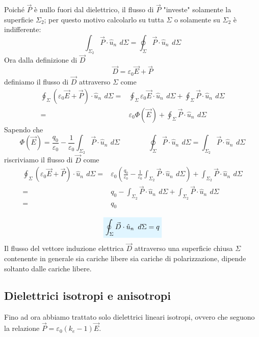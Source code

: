 \documentclass[x11names]{report}
\newcommand{\viola}[1]{%
	\colorbox{myblue}{$\displaystyle #1$}
}
\begin{document}
Poiché \(\vec{P}\) è nullo fuori dal dielettrico, il flusso di \(\vec{P}\) "investe" solamente la superficie \(\Sigma_2\); per questo motivo calcolarlo su tutta \(\Sigma\) o solamente su \(\Sigma_2\) è indifferente:
\[
\int_{\Sigma_2}\vec{P}\cdot\hat{u}_n \,\ d\Sigma = \oint_{\Sigma}\vec{P}\cdot\hat{u}_n \,\ d\Sigma
\]
Ora dalla definizione di \(\vec{D}\)
\[
\vec{D} = \varepsilon_0 \vec{E} + \vec{P}
\]
definiamo il flusso di \(\vec{D}\) attraverso \(\Sigma\) come
\begin{align*}
	\oint_\Sigma \left(\varepsilon_0 \vec{E} + \vec{P}\right)\cdot\hat{u}_n \,\ d\Sigma =& \oint_\Sigma \varepsilon_0 \vec{E}\cdot\hat{u}_n \,\ d\Sigma +  \oint_\Sigma\vec{P}\cdot\hat{u}_n \,\ d\Sigma  \\
	=& \varepsilon_0 \Phi(\vec{E}) +  \oint_\Sigma\vec{P}\cdot\hat{u}_n \,\ d\Sigma
\end{align*}
Sapendo che
\[
\Phi(\vec{E}) = \frac{q_0}{\varepsilon_0} - \frac{1}{\varepsilon_0} \int_{\Sigma_2} \vec{P}\cdot\hat{u}_n \,\ d\Sigma \qquad \qquad   \oint_{\Sigma}\vec{P}\cdot\hat{u}_n \,\ d\Sigma = \int_{\Sigma_2}\vec{P}\cdot\hat{u}_n \,\ d\Sigma 
\]
riscriviamo il flusso di \(\vec{D}\) come 
\begin{align*}
	\oint_\Sigma \left(\varepsilon_0 \vec{E} + \vec{P}\right)\cdot\hat{u}_n \,\ d\Sigma =& \varepsilon_0\left(\frac{q_0}{\varepsilon_0} - \frac{1}{\varepsilon_0} \int_{\Sigma_2} \vec{P}\cdot\hat{u}_n \,\ d\Sigma\right) + \int_{\Sigma_2}\vec{P}\cdot\hat{u}_n \,\ d\Sigma \\
	=& q_0 - \int_{\Sigma_2} \vec{P}\cdot\hat{u}_n \,\ d\Sigma+ \int_{\Sigma_2}\vec{P}\cdot\hat{u}_n \,\ d\Sigma \\
	=& q_0
\end{align*}

\begin{equation}
	\viola{\oint_\Sigma \vec{D}\cdot\hat{u}_n \,\ d\Sigma = q}
\end{equation}
Il flusso del vettore induzione elettrica \(\vec{D}\) attraverso una superficie chiusa \(\Sigma\) contenente in generale sia cariche libere sia cariche di polarizzazione, dipende soltanto dalle cariche libere.


\subsection{Dielettrici isotropi e anisotropi}
Fino ad ora abbiamo trattato solo dielettrici lineari isotropi, ovvero che seguono la relazione \(\vec{P} = \varepsilon_0(k_e - 1)\vec{E}\).
\end{document}
